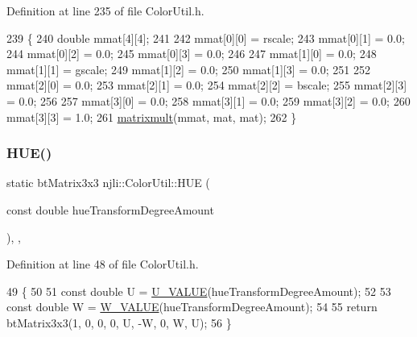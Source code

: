 Definition at line 235 of file Color\+Util.\+h.


\begin{DoxyCode}
239     \{
240       \textcolor{keywordtype}{double} mmat[4][4];
241 
242       mmat[0][0] = rscale;
243       mmat[0][1] = 0.0;
244       mmat[0][2] = 0.0;
245       mmat[0][3] = 0.0;
246 
247       mmat[1][0] = 0.0;
248       mmat[1][1] = gscale;
249       mmat[1][2] = 0.0;
250       mmat[1][3] = 0.0;
251 
252       mmat[2][0] = 0.0;
253       mmat[2][1] = 0.0;
254       mmat[2][2] = bscale;
255       mmat[2][3] = 0.0;
256 
257       mmat[3][0] = 0.0;
258       mmat[3][1] = 0.0;
259       mmat[3][2] = 0.0;
260       mmat[3][3] = 1.0;
261       \mbox{\hyperlink{classnjli_1_1_color_util_a5cb3576c8177f303c88dc4e7283367c7}{matrixmult}}(mmat, mat, mat);
262     \}
\end{DoxyCode}
\mbox{\label{classnjli_1_1_color_util_a500118a29045f966fb8c6ed8ea505e49}} 
\subsubsection{\texorpdfstring{H\+U\+E()}{HUE()}}
{\footnotesize\ttfamily static bt\+Matrix3x3 njli\+::\+Color\+Util\+::\+H\+UE (\begin{DoxyParamCaption}\item[{const double}]{hue\+Transform\+Degree\+Amount }\end{DoxyParamCaption})\hspace{0.3cm}{\ttfamily [inline]}, {\ttfamily [static]}, {\ttfamily [private]}}



Definition at line 48 of file Color\+Util.\+h.


\begin{DoxyCode}
49     \{
50 
51       \textcolor{keyword}{const} \textcolor{keywordtype}{double} U = \mbox{\hyperlink{classnjli_1_1_color_util_af8c30d8240cec7a999c78faf633f5672}{U\_VALUE}}(hueTransformDegreeAmount);
52 
53       \textcolor{keyword}{const} \textcolor{keywordtype}{double} W = \mbox{\hyperlink{classnjli_1_1_color_util_a546dcc4ae049c5b45d9bd20870226768}{W\_VALUE}}(hueTransformDegreeAmount);
54 
55       \textcolor{keywordflow}{return} btMatrix3x3(1, 0, 0, 0, U, -W, 0, W, U);
56     \}
\end{DoxyCode}
\mbox{\label{classnjli_1_1_color_util_ac05958efe06cd5958961a0f79da8f1eb}} 
